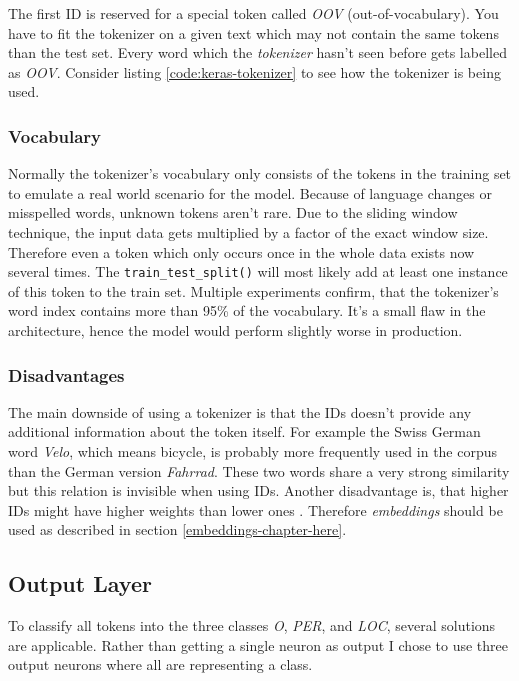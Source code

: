 The first ID is reserved for a special token called \emph{OOV} (out-of-vocabulary). You have to fit the tokenizer on a given text which may not contain the same tokens than the test set. Every word which the \emph{tokenizer} hasn't seen before gets labelled as \emph{OOV}. Consider listing \ref{code:keras-tokenizer} to see how the tokenizer is being used.

\subsubsection{Vocabulary}

Normally the tokenizer's vocabulary only consists of the tokens in the training set to emulate a real world scenario for the model. Because of language changes or misspelled words, unknown tokens aren't rare. Due to the sliding window technique, the input data gets multiplied by a factor of the exact window size. Therefore even a token which only occurs once in the whole data exists now several times. The \verb|train_test_split()| will most likely add at least one instance of this token to the train set. Multiple experiments confirm, that the tokenizer's word index contains more than 95\% of the vocabulary. It's a small flaw in the architecture, hence the model would perform slightly worse in production.

\subsubsection{Disadvantages}

The main downside of using a tokenizer is that the IDs doesn't provide any additional information about the token itself. For example the Swiss German word \emph{Velo}, which means bicycle, is probably more frequently used in the corpus than the German version \emph{Fahrrad}. These two words share a very strong similarity but this relation is invisible when using IDs. Another disadvantage is, that higher IDs might have higher weights than lower ones \cite{nurz18}. Therefore \emph{embeddings} should be used as described in section \ref{embeddings-chapter-here}.

\subsection{Output Layer}

To classify all tokens into the three classes \emph{O}, \emph{PER}, and \emph{LOC}, several solutions are applicable. Rather than getting a single neuron as output I chose to use three output neurons where all are representing a class. 

